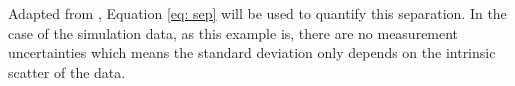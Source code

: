 \documentclass[fleqn,usenatbib]{mnras}
\begin{document}



Adapted from \citet{Lindegren2013}, Equation \ref{eq: sep} will be used to quantify this separation. In the case of the simulation data, as this example is, there are no measurement uncertainties which means the standard deviation only depends on the intrinsic scatter of the data. 
\end{document}
